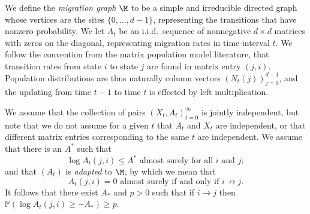 \documentclass[11pt]{amsart}
\renewcommand{\P}{\mathbb{P}}
\begin{document}
We define the {\em migration graph} $\M$ to be a simple and irreducible directed graph 
whose vertices are the sites $\{0,\dots,d-1\}$, representing the transitions that have nonzero
probability.
We let $A_{t}$ be an i.i.d.\ sequence of nonnegative
$d\times d$ matrices with zeros on the diagonal, representing migration rates in time-interval $t$. 
We follow the convention from the matrix population model literature, that transition
rates from state $i$ to state $j$ are found in matrix entry $(j,i)$. 
Population distributions
are thus naturally column vectors $(N_t(j))_{j=0}^{d-1}$, and the updating from time $t-1$ to time $t$ is effected
by left multiplication.

We assume that
the collection of pairs $(X_{t},A_{t})_{t=0}^\infty$ is jointly independent, but note that 
we do not assume for a given $t$ that $A_{t}$ and $X_{t}$ are independent, or that different matrix entries
corresponding to the same $t$ are independent.
We assume that there is an $A^*$ such that
\begin{equation} \label{E:Astar}
	\log A_{t}(j,i)  \le A^*\text{ almost surely for all $i$ and $j$};
\end{equation}
and that $(A_t)$ is {\em adapted} to $\M$, by which we mean that
\begin{equation}
	\label{E:Azero}
	A_t(j,i) = 0 \text{ almost surely if and only if } i\nrightarrow j.
\end{equation}
It follows that there exist $A_*$ and $p>0$ such that if $i\to j$ then ${\P(\log A_t(j,i)\ge -A_*)\ge p}$.
\end{document}
